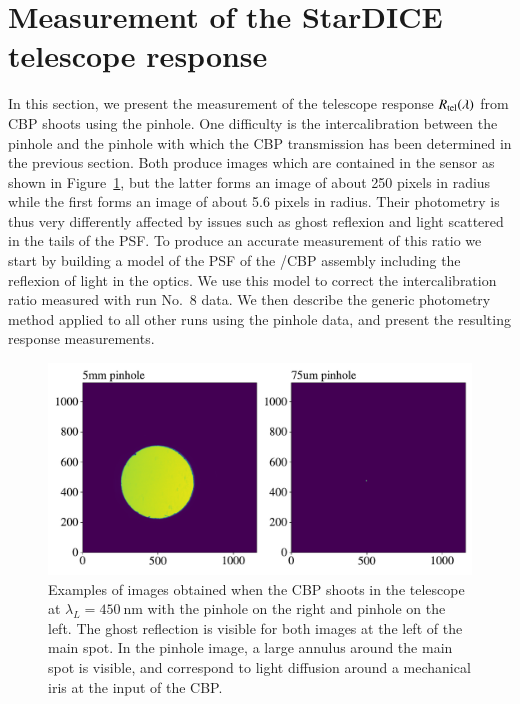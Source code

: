 \section{Measurement of the StarDICE telescope response}
\label{sec:rsd}
\label{sec:sd_datadesc}

In this section, we present the measurement of the \SD telescope response $R_{\mathrm{tel}}(\lambda)$ from CBP shoots using the \spinhole pinhole. One difficulty is the intercalibration between the \spinhole pinhole and the \bpinhole pinhole with which the CBP transmission has been determined in the previous section. Both produce images which are contained in the \SD sensor as shown in Figure~\ref{fig:ccd_examples}, but the latter forms an image of about 250 pixels in radius while the first forms an image of about 5.6 pixels in radius. Their photometry is thus  very differently affected by issues such as ghost reflexion and light scattered in the tails of the PSF. To produce an accurate measurement of this ratio we start by building a model of the PSF of the \SD/CBP assembly including the reflexion of light in the optics. We use this model to correct the intercalibration ratio measured with run No.~8 data. We then describe the generic photometry method applied to all other runs using the \spinhole pinhole data, and present the resulting response measurements.   

\begin{figure}[h]
    \centering
    \includegraphics[width=\columnwidth]{fig/ccd_examples.pdf}
    \caption{Examples of images obtained when the CBP shoots in the \SD telescope at $\lambda_L=\SI{450}{\nm}$ with the \bpinhole pinhole on the right and \spinhole pinhole on the left. The ghost reflection is visible for both images at the left of the main spot. In the \bpinhole pinhole image, a large annulus around the main spot is visible, and correspond to light diffusion around a mechanical iris at the input of the CBP.}
    \label{fig:ccd_examples}
\end{figure}


